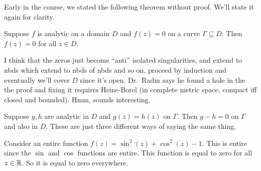 Early in the course, we stated the following theorem without proof. We'll state it again for clarity.
\begin{theorem}
    Suppose $f$ is analytic on a domain $D$ and $f(z)=0$ on a curve $\Gamma \subseteq D$. Then $f(z)=0$ for all $z\in D$.
\end{theorem}
I think that the zeros just become ``anti'' isolated singularities, and extend to nbds which extend to nbds of nbds and so on, proceed by induction and eventually we'll cover $D$ since it's open. Dr.\ Radin says he found a hole in the the proof and fixing it requires Heine-Borel (in complete metric space, compact iff closed and bounded). Hmm, sounds interesting. 
\begin{note}
    Suppose $g,h$ are analytic in $D$ and $g(z)=h(z)$ on $\Gamma $. Then $g-h=0$ on $\Gamma $ and also in $D$. These are just three different ways of saying the same thing.
\end{note}
\begin{example}
    Consider an entire function $f(z)=\sin^2(z)+\cos^2(z)-1$. This is entire since the $\sin$ and $\cos$ functions are entire. This function is equal to zero for all $z\in \mathbb{R}$. So it is equal to zero everywhere.
\end{example}

